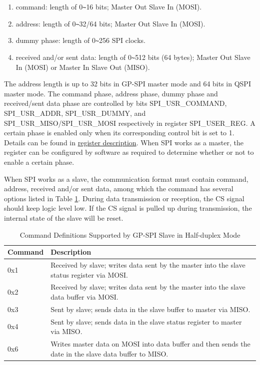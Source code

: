 \documentclass[main\_\_EN.tex]{subfiles}
\begin{document}
\begin{enumerate}
    \item command: length of 0\verb+~+16 bits; Master Out Slave In (MOSI).
    \item address: length of 0\verb+~+32/64 bits; Master Out Slave In (MOSI).
    \item dummy phase: length of 0\verb+~+256 SPI clocks.
    \item received and/or sent data: length of 0\verb+~+512 bits (64 bytes); Master Out Slave In (MOSI) or Master In Slave Out (MISO).
\end{enumerate}

The address length is up to 32 bits in GP-SPI master mode and 64 bits in QSPI master mode. The command phase, address phase, dummy phase and received/sent data phase are controlled by bits SPI\_USR\_COMMAND, SPI\_USR\_ADDR, SPI\_USR\_DUMMY, and SPI\_USR\_MISO/SPI\_USR\_MOSI respectively in register SPI\_USER\_REG. A certain phase is enabled only when its corresponding control bit is set to 1. Details can be found in \hyperref[regdesc:SPIUSERREG]{register description}. When SPI works as a master, the register can be configured by software as required to determine whether or not to enable a certain phase.

When SPI works as a slave, the communication format must contain command, address, received and/or sent data, among which the command has several options listed in Table \ref{table:slave_cmd_description}. During data transmission or reception, the CS signal should keep logic level low. If the CS signal is pulled up during transmission, the internal state of the slave will be reset.

\begin{table}
    \centering
    \caption{Command Definitions Supported by GP-SPI Slave in Half-duplex Mode}
    \label{table:slave_cmd_description}
    \begin{tabular}[l]{|m{2cm}|m{14cm}|}
    \hline
    \rowcolor{lightgray}
    Command & Description\\
    \hline
    0x1 & Received by slave; writes data sent by the master into the slave status register via MOSI. \\
    \hline
    0x2 & Received by slave; writes data sent by the master into the slave data buffer via MOSI.\\
    \hline
    0x3 & Sent by slave; sends data in the slave buffer to master via MISO.\\
    \hline
    0x4 & Sent by slave; sends data in the slave status register to master via MISO. \\
    \hline
    0x6 & Writes master data on MOSI into data buffer and then sends the date in the slave data buffer to MISO.\\
    \hline
    \end{tabular}
\end{table}
\end{document}
